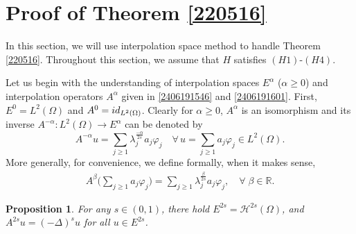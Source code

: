 \documentclass[10pt]{article}
\numberwithin{equation}{section}
\newtheorem{proposition}[theorem]{Proposition}
\newcommand{\R}{\mathbb R}
\def \O{\Omega}
\numberwithin{equation}{section}
\begin{document}
\section{Proof of Theorem \ref{220516}}\label{2306141421}
In this section, we will use interpolation space method to handle Theorem \ref{220516}. Throughout this section, we assume that $H$ satisfies $(H1)$-$(H4)$. 

Let us begin with the understanding of interpolation spaces $E^{\alpha}$ ($\alpha \ge 0$) and interpolation operators $A^{\alpha}$ given in \eqref{2406191546} and \eqref{2406191601}. First, $E^0=L^2(\Omega)$ and $A^{0} = {\rm id}_{L^2(\O)}$. Clearly for $\alpha \ge 0$, $A^{\alpha}$ is an isomorphism and its inverse $A^{-\alpha}: L^2(\Omega)\to E^{\alpha}$ can be denoted by
\[
A^{-\alpha}u=\sum_{j\ge 1}\lambda_j^{\frac{-\alpha}{2s}}a_j\varphi_j\quad \forall\, u=\sum_{j\ge 1}a_j\varphi_j\in L^2(\Omega).
\]
More generally, for convenience, we define formally, when it makes sense, 
\begin{align}
\label{Abeta}
A^\beta\Big(\sum_{j\ge 1}a_j\varphi_j\Big) =\sum_{j\ge 1}\lambda_j^{\frac{\beta}{2s}}a_j\varphi_j, \quad \forall\;\beta \in \R.
\end{align}
\begin{proposition}\label{2209072124}
For any $s \in (0, 1)$, there hold $E^{2s}=\mathcal{H}^{2s}(\Omega)$, and $A^{2s}u=(-\Delta)^s u$ for all $u\in E^{2s}$.
\end{proposition}
\end{document}
